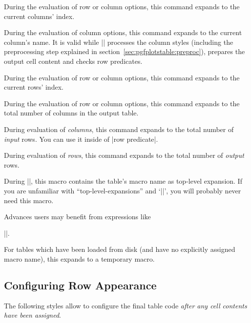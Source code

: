 \begin{command}{\pgfplotstablecol}
	During the evaluation of row or column options, this command expands to the current columns' index.
\end{command}
\begin{command}{\pgfplotstablecolname}
	During the evaluation of column options, this command expands to the current column's name. It is valid while |\pgfplotstabletypeset| processes the column styles (including the preprocessing step explained in section~\ref{sec:pgfplotstable:preproc}), prepares the output cell content and checks row predicates.
\end{command}
\label{pgfplotstable:page:tablerow}
\begin{command}{\pgfplotstablerow}
	During the evaluation of row or column options, this command expands to the current rows' index.
\end{command}
\begin{command}{\pgfplotstablecols}
	During the evaluation of row or column options, this command expands to the total number of columns in the output table.
\end{command}
\begin{command}{\pgfplotstablerows}
	During evaluation of \emph{columns}, this command expands to the total number of \emph{input} rows. You can use it inside of |row predicate|.

	During evaluation of \emph{rows}, this command expands to the total number of \emph{output} rows.
\end{command}
\begin{command}{\pgfplotstablename}
	During |\pgfplotstabletypeset|, this macro contains the table's macro name as top-level expansion. If you are unfamiliar with ``top-level-expansions'' and `|\expandafter|', you will probably never need this macro.
	
	Advances users may benefit from expressions like 
	
	|\expandafter\pgfplotstabletypeset\pgfplotstablename|.

	For tables which have been loaded from disk (and have no explicitly assigned macro name), this expands to a temporary macro.
\end{command}


\subsection{Configuring Row Appearance}
The following styles allow to configure the final table code \emph{after any cell contents have been assigned}.

